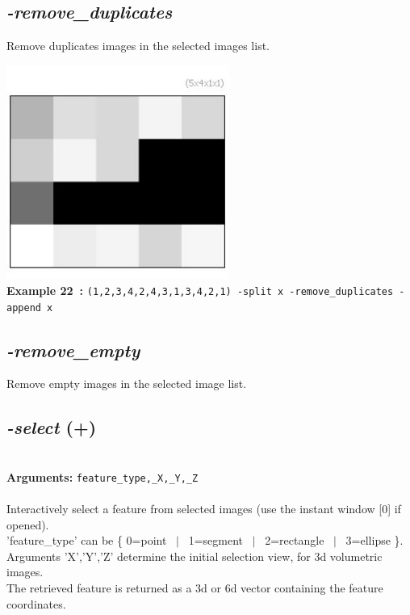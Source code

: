 \documentclass[a4paper,11pt,twoside]{book}
\begin{document}
\subsection{\emph{-remove\_duplicates} }\vspace*{-0.5em}
Remove duplicates images in the selected images list.
\begin{center}\includegraphics[keepaspectratio=true,height=7cm,width=\textwidth]{img/gmic_def22.jpg}\\
{\footnotesize \textbf{Example 22~:} \texttt{(1,2,3,4,2,4,3,1,3,4,2,1) -split x -remove\_duplicates -append x}}
\end{center}

\subsection{\emph{-remove\_empty} }\vspace*{-0.5em}
Remove empty images in the selected image list.


\subsection{\emph{-select} (+)}\vspace*{-0.5em}
~\\\textbf{Arguments: } 
{\small \texttt{feature\_type,\_X,\_Y,\_Z}}\\~\\
Interactively select a feature from selected images (use the instant window [0] if opened).
~\\'feature\_type' can be \{ 0=point ~$|$~ 1=segment ~$|$~ 2=rectangle ~$|$~ 3=ellipse \}.
~\\Arguments 'X','Y','Z' determine the initial selection view, for 3d volumetric images.
~\\The retrieved feature is returned as a 3d or 6d vector containing the feature coordinates.
\end{document}

